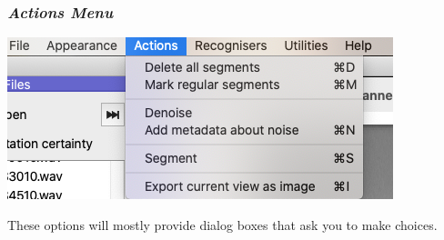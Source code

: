 \documentclass{article}
\begin{document}
\subsubsection{{\em Actions Menu}}
\label{sec:action}

\begin{center}
\includegraphics[width=.5\textwidth]{Figures/ActionsMenu}
\end{center}

These options will mostly provide dialog boxes that ask you to make choices. 
\end{document}
